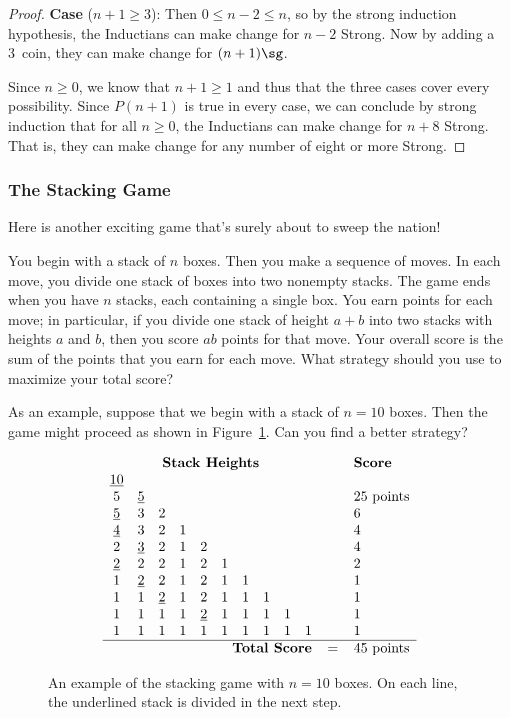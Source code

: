 \begin{proof}
\textbf{Case} ($n+1 \geq 3$): Then $0 \leq n - 2 \leq n$, so by the
strong induction hypothesis, the Inductians can make change for $n-2$
Strong.  Now by adding a 3\sg\ coin, they can make change for
$(n+1)\sg$.

Since $n \ge 0$, we know that $n + 1 \ge 1$ and thus that the three cases
cover every possibility.  Since $P(n+1)$ is true in every case, we can
conclude by strong induction
that for all $n \ge 0$, the Inductians can make change for $n+8$
Strong.  That is, they can make change for any number of eight or more
Strong.

\end{proof}

\subsubsection{The Stacking Game}

Here is another exciting game that's surely about to sweep the
nation!

You begin with a stack of $n$ boxes.  Then you
make a sequence of moves.  In each move, you divide one stack of boxes
into two nonempty stacks.  The game ends when you have $n$ stacks, each
containing a single box.  You earn points for each move; in particular, if
you divide one stack of height $a + b$ into two stacks with heights $a$
and $b$, then you score $ab$ points for that move.  Your overall score is
the sum of the points that you earn for each move.  What strategy should
you use to maximize your total score?

As an example, suppose that we begin with a stack of $n = 10$ boxes.
Then the game might proceed as shown in Figure~\ref{fig:stacking-10}.
Can you find a better strategy?
\begin{figure}\redrawntrue
\[
\begin{array}{cccccccccccl}
\multicolumn{10}{c}{\textbf{Stack Heights}} & \quad & \textbf{Score} \\
\underline{10}&&&&&&&&& && \\
5&\underline{5}&&&&&&&& && 25 \text{ points} \\
\underline{5}&3&2&&&&&&& && 6 \\
\underline{4}&3&2&1&&&&&& && 4 \\
2&\underline{3}&2&1&2&&&&& && 4 \\
\underline{2}&2&2&1&2&1&&&& && 2 \\
1&\underline{2}&2&1&2&1&1&&& && 1 \\
1&1&\underline{2}&1&2&1&1&1&& && 1 \\
1&1&1&1&\underline{2}&1&1&1&1& && 1 \\
1&1&1&1&1&1&1&1&1&1 && 1 \\ \hline
\multicolumn{10}{r}{\textbf{Total Score}} & = & 45 \text{ points}
\end{array}
\]
\caption{An example of the stacking game with $n = 10$ boxes.  On each
line, the underlined stack is divided in the next step.}
\label{fig:stacking-10}
\end{figure}

